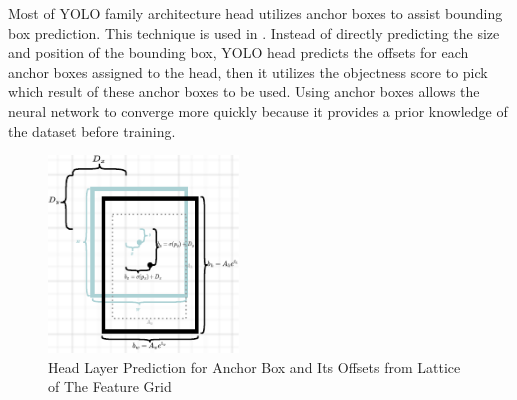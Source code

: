     Most of YOLO family architecture head utilizes anchor boxes to assist bounding box prediction.
    This technique is used in \textcites{yolov2}{yolov3}{yolov4}{scaledyolov4}{yolov5}{yolor}{yolov7}.
    Instead of directly predicting the size and position of the bounding box, YOLO head predicts 
    the offsets for each anchor boxes assigned to the head, then it utilizes the objectness score to pick
    which result  of these anchor boxes to be used.
    Using anchor boxes allows the neural network to converge more quickly because it provides
    a prior knowledge of the dataset before training.
    
    \begin{figure}[t]
        \centering
        \includegraphics[width=0.45\textwidth]{figures/anchor.pdf}
        \caption{Head Layer Prediction for Anchor Box and Its Offsets from Lattice of The Feature Grid }
        \label{fig:anchorbox}
    \end{figure}

  
